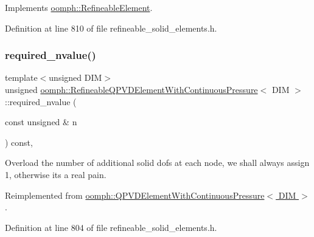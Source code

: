 Implements \hyperlink{classoomph_1_1RefineableElement_a33324be27833fa4b78279d17158215fa}{oomph\+::\+Refineable\+Element}.



Definition at line 810 of file refineable\+\_\+solid\+\_\+elements.\+h.

\mbox{\label{classoomph_1_1RefineableQPVDElementWithContinuousPressure_a1ab39caa5f26573cb1d38ab8f9f0d76d}} 
\subsubsection{\texorpdfstring{required\+\_\+nvalue()}{required\_nvalue()}}
{\footnotesize\ttfamily template$<$unsigned D\+IM$>$ \\
unsigned \hyperlink{classoomph_1_1RefineableQPVDElementWithContinuousPressure}{oomph\+::\+Refineable\+Q\+P\+V\+D\+Element\+With\+Continuous\+Pressure}$<$ D\+IM $>$\+::required\+\_\+nvalue (\begin{DoxyParamCaption}\item[{const unsigned \&}]{n }\end{DoxyParamCaption}) const\hspace{0.3cm}{\ttfamily [inline]}, {\ttfamily [virtual]}}



Overload the number of additional solid dofs at each node, we shall always assign 1, otherwise it\textquotesingle{}s a real pain. 



Reimplemented from \hyperlink{classoomph_1_1QPVDElementWithContinuousPressure_a58a49882b5db5b044017f0a35bb41241}{oomph\+::\+Q\+P\+V\+D\+Element\+With\+Continuous\+Pressure$<$ D\+I\+M $>$}.



Definition at line 804 of file refineable\+\_\+solid\+\_\+elements.\+h.

\mbox{\label{classoomph_1_1RefineableQPVDElementWithContinuousPressure_a78ac41286548a45383abb385a1be4598}} 
